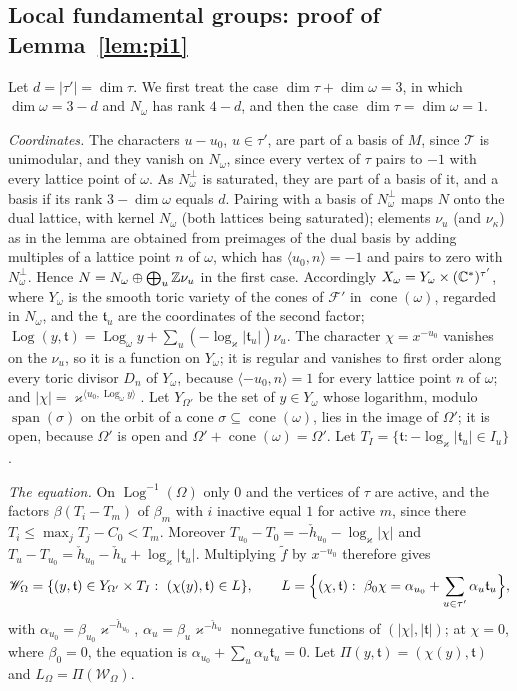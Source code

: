 \subsection{Local fundamental groups: proof of Lemma~\ref{lem:pi1}}\label{app:collar}
Let $d=|\tau'|=\dim\tau$. We first treat the case $\dim\tau+\dim\omega=3$, in which $\dim\omega=3-d$ and $N_\omega$ has rank $4-d$, and then the case $\dim\tau=\dim\omega=1$.

\emph{Coordinates.} The characters $u-u_0$, $u\in\tau'$, are part of a basis of $M$, since $\mathcal T$ is unimodular, and they vanish on $N_\omega$, since every vertex of $\tau$ pairs to $-1$ with every lattice point of $\omega$. As $N_\omega^\perp$ is saturated, they are part of a basis of it, and a basis if its rank $3-\dim\omega$ equals $d$. Pairing with a basis of $N_\omega^\perp$ maps $N$ onto the dual lattice, with kernel $N_\omega$ (both lattices being saturated); elements $\nu_u$ (and $\nu_\kappa$) as in the lemma are obtained from preimages of the dual basis by adding multiples of a lattice point $n$ of $\omega$, which has $\langle u_0,n\rangle=-1$ and pairs to zero with $N_\omega^\perp$. Hence $N=N_\omega\oplus\bigoplus_u\mathbb Z\nu_u$ in the first case. Accordingly $X_\omega=Y_\omega\times(\mathbb C^*)^{\tau'}$, where $Y_\omega$ is the smooth toric variety of the cones of $\mathcal F'$ in $\operatorname{cone}(\omega)$, regarded in $N_\omega$, and the $\mathfrak t_u$ are the coordinates of the second factor; $\operatorname{Log}(y,\mathfrak t)=\operatorname{Log}_\omega y+\sum_u(-\log_\varkappa|\mathfrak t_u|)\nu_u$. The character $\chi=x^{-u_0}$ vanishes on the $\nu_u$, so it is a function on $Y_\omega$; it is regular and vanishes to first order along every toric divisor $D_n$ of $Y_\omega$, because $\langle -u_0,n\rangle=1$ for every lattice point $n$ of $\omega$; and $|\chi|=\varkappa^{\langle u_0,\operatorname{Log}_\omega y\rangle}$. Let $Y_{\Omega'}$ be the set of $y\in Y_\omega$ whose logarithm, modulo $\operatorname{span}(\sigma)$ on the orbit of a cone $\sigma\subseteq \operatorname{cone}(\omega)$, lies in the image of $\Omega'$; it is open, because $\Omega'$ is open and $\Omega'+\operatorname{cone}(\omega)=\Omega'$. Let $T_I=\{\mathfrak t:-\log_\varkappa|\mathfrak t_u|\in I_u\}$.

\emph{The equation.} On $\operatorname{Log}^{-1}(\Omega)$ only $0$ and the vertices of $\tau$ are active, and the factors $\beta(T_i-T_m)$ of $\beta_m$ with $i$ inactive equal $1$ for active $m$, since there $T_i\le\max_jT_j-C_0<T_m$. Moreover $T_{u_0}-T_0=-\check h_{u_0}-\log_\varkappa|\chi|$ and $T_u-T_{u_0}=\check h_{u_0}-\check h_u+\log_\varkappa|\mathfrak t_u|$. Multiplying $\tilde f$ by $x^{-u_0}$ therefore gives
\[
\mathscr W_\Omega=\{(y,\mathfrak t)\in Y_{\Omega'}\times T_I:\ (\chi(y),\mathfrak t)\in L\},\qquad L=\Bigl\{(\chi,\mathfrak t):\ \beta_0\chi=\alpha_{u_0}+\sum_{u\in\tau'}\alpha_u\mathfrak t_u\Bigr\},
\]
with $\alpha_{u_0}=\beta_{u_0}\varkappa^{-\check h_{u_0}}$, $\alpha_u=\beta_u\varkappa^{-\check h_u}$ nonnegative functions of $(|\chi|,|\mathfrak t|)$; at $\chi=0$, where $\beta_0=0$, the equation is $\alpha_{u_0}+\sum_u\alpha_u\mathfrak t_u=0$. Let $\Pi(y,\mathfrak t)=(\chi(y),\mathfrak t)$ and $L_\Omega=\Pi(\mathscr W_\Omega)$.


